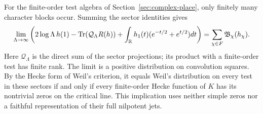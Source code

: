 For the finite-order test algebra of Section~\ref{sec:complex-place},
only finitely many character blocks occur. Summing the sector identities
gives
\[
 \lim_{\Lambda\to\infty}
 \left(2\log\Lambda\,h(1)-\operatorname{Tr}(\mathcal Q_\Lambda R(h))
       +\int_\mathbb R h_1(t)(e^{-t/2}+e^{t/2})dt\right)
                 =\sum_{\chi\in F}\mathfrak B_\chi(h_\chi).
\]
Here $\mathcal Q_\Lambda$ is the direct sum of the sector projections;
its product with a finite-order test has finite rank. The limit is a
positive distribution on convolution squares. By the Hecke form of
Weil's criterion, it equals Weil's distribution on every test in these
sectors if and only if every finite-order Hecke function of $K$ has
its nontrivial zeros on the critical line. This implication uses neither
simple zeros nor a faithful representation of their full nilpotent jets.

